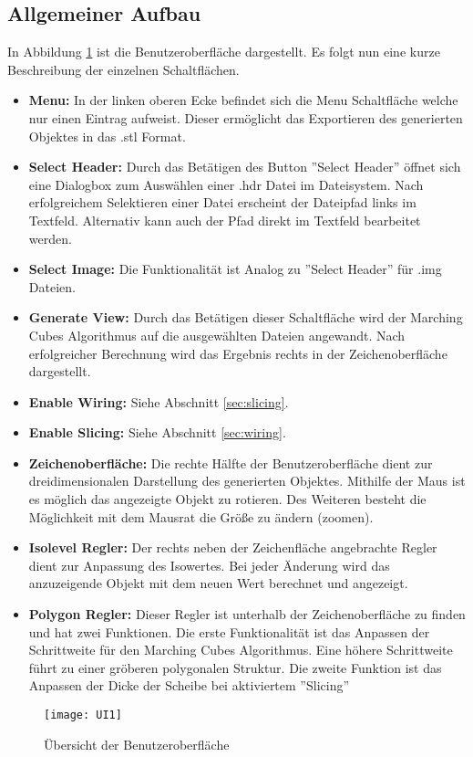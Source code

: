 \subsection{Allgemeiner Aufbau}
In Abbildung \ref{fig:UI1} ist die Benutzeroberfläche dargestellt. Es folgt nun eine kurze Beschreibung der einzelnen Schaltflächen.
\begin{itemize}
	\item \textbf{Menu:} In der linken oberen Ecke befindet sich die Menu Schaltfläche welche nur einen Eintrag aufweist. Dieser ermöglicht das Exportieren des generierten Objektes in das .stl Format.
	\item \textbf{Select Header:} Durch das Betätigen des Button ''Select Header'' öffnet sich eine Dialogbox zum Auswählen einer .hdr Datei im Dateisystem. Nach erfolgreichem Selektieren einer Datei erscheint der Dateipfad links im Textfeld. Alternativ kann auch der Pfad direkt im Textfeld bearbeitet werden.
	\item \textbf{Select Image:} Die Funktionalität ist Analog zu ''Select Header'' für .img Dateien.
	\item \textbf{Generate View:} Durch das Betätigen dieser Schaltfläche wird der Marching Cubes Algorithmus auf die ausgewählten Dateien angewandt. Nach erfolgreicher Berechnung wird das Ergebnis rechts in der Zeichenoberfläche dargestellt.
	\item \textbf{Enable Wiring:} Siehe Abschnitt \ref{sec:slicing}.
	\item \textbf{Enable Slicing:} Siehe Abschnitt \ref{sec:wiring}.
	\item \textbf{Zeichenoberfläche:} Die rechte Hälfte der Benutzeroberfläche dient zur dreidimensionalen Darstellung des generierten Objektes. Mithilfe der Maus ist es möglich das angezeigte Objekt zu rotieren. Des Weiteren besteht die Möglichkeit mit dem Mausrat die Größe zu ändern (zoomen).
	\item \textbf{Isolevel Regler:} Der rechts neben der Zeichenfläche angebrachte Regler dient zur Anpassung des Isowertes. Bei jeder Änderung wird das anzuzeigende Objekt mit dem neuen Wert berechnet und angezeigt.
	\item \textbf{Polygon Regler:} Dieser Regler ist unterhalb der Zeichenoberfläche zu finden und hat zwei Funktionen. Die erste Funktionalität ist das Anpassen der Schrittweite für den Marching Cubes Algorithmus. Eine höhere Schrittweite führt zu einer gröberen polygonalen Struktur. Die zweite Funktion ist das Anpassen der Dicke der Scheibe bei aktiviertem ''Slicing''
\end{itemize}
\begin{figure}[H]
	\centering
	\texttt{[image: UI1]}
	\caption{Übersicht der Benutzeroberfläche}
	\label{fig:UI1}
\end{figure}
